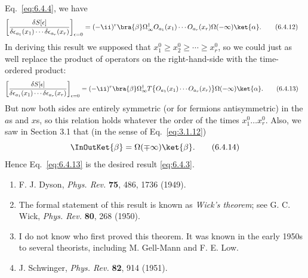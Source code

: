 
Eq.~\eqref{eq:6.4.4}, we have
\begin{align}
\left[
  \frac{\delta S[\epsilon]}
  {\delta\epsilon_{a_1}(x_1)\cdots\delta\epsilon_{a_r}(x_r)}
\right]_{\epsilon=0}
={}&(-\ii)^r
\bra{\beta}\Omega^\dagger_{\infty}
O_{a_1}(x_1)\cdots O_{a_r}(x_r)
\Omega(-\infty)\ket{\alpha}.
\tag{6.4.12}
\label{eq:6.4.12}
\end{align}
In deriving this result we supposed that
$x_1^0\geq x_2^0\geq\cdots\geq x_r^0$, so we could just as well replace
the product of operators on the right-hand-side with the time-ordered
product:
\begin{align}
\left[
  \frac{\delta S[\epsilon]}
  {\delta\epsilon_{a_1}(x_1)\cdots\delta\epsilon_{a_r}(x_r)}
\right]_{\epsilon=0}
={}&(-\ii)^r
\bra{\beta}\Omega^\dagger_{\infty}
T\bigl\{O_{a_1}(x_1)\cdots O_{a_r}(x_r)\bigr\}
\Omega(-\infty)\ket{\alpha}.
\tag{6.4.13}
\label{eq:6.4.13}
\end{align}
But now both sides are entirely symmetric (or for fermions antisymmetric)
in the $a$s and $x$s, so this relation holds whatever the order of the times
$x_1^0\ldots x_r^0$. Also, we saw in Section 3.1 that (in the sense of
Eq.~\eqref{eq:3.1.12})
\begin{equation}
\InOutKet{\beta}=\Omega(\mp\infty)\ket{\beta}.
\tag{6.4.14}
\label{eq:6.4.14}
\end{equation}
Hence Eq.~\eqref{eq:6.4.13} is the desired result \eqref{eq:6.4.3}.



\begin{enumerate}
\item\label{ref:6.1} F. J. Dyson, \emph{Phys. Rev.} \textbf{75}, 486, 1736 (1949).

\item\label{ref:6.2} The formal statement of this result is known as \textit{Wick's
theorem}; see G. C. Wick, \emph{Phys. Rev.} \textbf{80}, 268 (1950).

\item\label{ref:6.3} I do not know who first proved this theorem. It was known in the early
1950s to several theorists, including M. Gell-Mann and F. E. Low.

\item\label{ref:6.4} J. Schwinger, \emph{Phys. Rev.} \textbf{82}, 914 (1951).
\end{enumerate}
